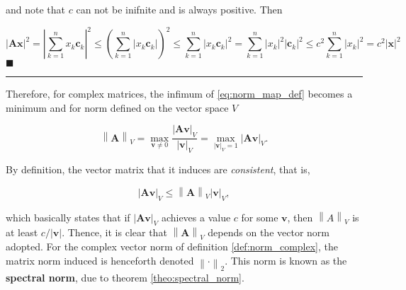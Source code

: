 	\noindent and note that $c$ can not be inifnite and is always positive. Then

\begin{equation} \left\lvert \mathbf{Ax}\right\rvert^2 = \left\lvert \sum_{k=1}^n x_k \mathbf{c}_k\right\rvert^2 \leq \left(\sum_{k=1}^n \left\lvert x_k \mathbf{c}_k\right\rvert\right)^2 \leq \sum_{k=1}^n \left\lvert x_k \mathbf{c}_k\right\rvert^2 = \sum_{k=1}^n \left\lvert x_k\right\rvert^2 \left\lvert\mathbf{c}_k\right\rvert^2 \leq c^2 \sum_{k=1}^n \left\lvert x_k\right\rvert^2  = c^2\left\lvert \mathbf{x}\right\rvert^2\end{equation}
\hfill$\blacksquare$
\vspace{5mm}
\hrule
\vspace{5mm} %

	Therefore, for complex matrices, the infimum of \eqref{eq:norm_map_def} becomes a minimum and for norm defined on the vector space $V$

\begin{equation}  \left\lVert \mathbf{A}\right\rVert_{V} = \max_{\mathbf{v}\neq 0} \dfrac{\left\lvert \mathbf{Av}\right\rvert_V}{\left\lvert \mathbf{v}\right\rvert_V} = \max_{\left\lvert \mathbf{v} \right\rvert_V = 1} \left\lvert \mathbf{Av}\right\rvert_V . \label{eq:matrix-norm_def} \end{equation}

	By definition, the vector matrix that it induces are \textit{consistent}, that is,

\begin{equation} \left\lvert \mathbf{Av}\right\rvert_V \leq \left\lVert \mathbf{A}\right\rVert_V \left\lvert \mathbf{v}\right\rvert_V, \label{eq:consistent_norm} \end{equation}

	\noindent which basically states that if $\left\lvert \mathbf{Av}\right\rvert_V$ achieves a value $c$ for some $\mathbf{v}$, then $\left\lVert A\right\rVert_V$ is at least $c/\left\lvert\mathbf{v}\right\rvert$. Thence, it is clear that $\left\lVert\mathbf{A}\right\rVert_V$ depends on the vector norm adopted. For the complex vector norm of definition \ref{def:norm_complex}, the matrix norm induced is henceforth denoted $\left\lVert \cdot\right\rVert_2$. This norm is known as the \textbf{spectral norm}, due to theorem \ref{theo:spectral_norm}.

